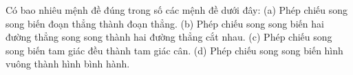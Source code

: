 \begin{ex}
Có bao nhiêu mệnh đề đúng trong số các mệnh đề dưới đây: (a) Phép chiếu song song biến đoạn thẳng thành đoạn thẳng. (b) Phép chiếu song song biến hai đường thẳng song song thành hai đường thẳng cắt nhau. (c) Phép chiếu song song biến tam giác đều thành tam giác cân. (d) Phép chiếu song song biến hình vuông thành hình bình hành.
\end{ex}
